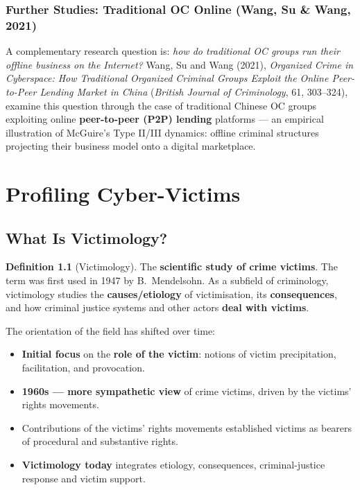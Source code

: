 \documentclass[11pt,a4paper,openany]{report}
\theoremstyle{definition}
\newtheorem{definition}{Definition}[chapter]
\theoremstyle{plain}
\theoremstyle{remark}
\begin{document}
\subsection{Further Studies: Traditional OC Online (Wang, Su \& Wang, 2021)}

A complementary research question is: \textit{how do traditional OC groups run their offline business on the Internet?} Wang, Su and Wang (2021), \textit{Organized Crime in Cyberspace: How Traditional Organized Criminal Groups Exploit the Online Peer-to-Peer Lending Market in China} (\textit{British Journal of Criminology}, 61, 303--324), examine this question through the case of traditional Chinese OC groups exploiting online \textbf{peer-to-peer (P2P) lending} platforms --- an empirical illustration of McGuire's Type II/III dynamics: offline criminal structures projecting their business model onto a digital marketplace.


\chapter{Profiling Cyber-Victims}

\section{What Is Victimology?}

\begin{definition}[Victimology]
The \textbf{scientific study of crime victims}. The term was first used in 1947 by B.\ Mendelsohn. As a subfield of criminology, victimology studies the \textbf{causes/etiology} of victimisation, its \textbf{consequences}, and how criminal justice systems and other actors \textbf{deal with victims}.
\end{definition}

The orientation of the field has shifted over time:
\begin{itemize}
    \item \textbf{Initial focus} on the \textbf{role of the victim}: notions of victim precipitation, facilitation, and provocation.
    \item \textbf{1960s --- more sympathetic view} of crime victims, driven by the victims' rights movements.
    \item Contributions of the victims' rights movements established victims as bearers of procedural and substantive rights.
    \item \textbf{Victimology today} integrates etiology, consequences, criminal-justice response and victim support.
\end{itemize}
\end{document}
